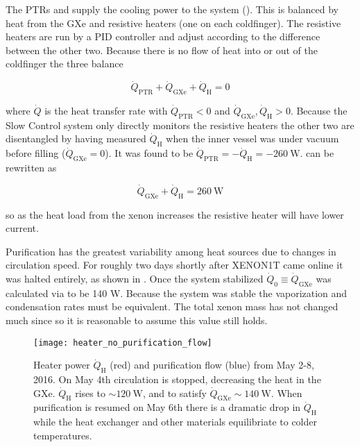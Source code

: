 The PTRs and  supply the cooling power to the system ().  This is balanced by heat from the GXe and
resistive heaters (one on each coldfinger).  The resistive heaters are run by a PID controller and adjust according to the difference
between the other two.  Because there is no flow of heat into or out of the coldfinger the three balance

\begin{equation}
\dot{Q}_{\mathrm{PTR}} + \dot{Q}_{\mathrm{GXe}} + \dot{Q}_{\mathrm{H}} = 0
\label{eq:electron_lifetime_model_vap_and_cond_heat_cons}
\end{equation}

\noindent where $\dot{Q}$ is the heat transfer rate with $\dot{Q}_{\mathrm{PTR}} < 0$ and
$\dot{Q}_{\mathrm{GXe}}, \dot{Q}_{\mathrm{H}} > 0$.  Because the Slow Control system only directly monitors the resistive heaters the
other two are disentangled by having measured $\dot{Q}_{\mathrm{H}}$ when the inner vessel was under vacuum before filling
($\dot{Q}_{\mathrm{GXe}} = 0$).  It was found
to be $\dot{Q}_{\mathrm{PTR}} = -\dot{Q}_{\mathrm{H}} = -260\ \mathrm{W}$.   can
be rewritten as

\begin{equation}
\dot{Q}_{\mathrm{GXe}} + \dot{Q}_{\mathrm{H}} = 260\ \mathrm{W}
\label{eq:electron_lifetime_model_vap_and_cond_heat_gxe}
\end{equation}

\noindent so as the heat load from the xenon increases the resistive heater will have lower current.

Purification has the greatest variability among heat sources due to changes in circulation speed.  For roughly two days shortly after
XENON1T came online it was halted entirely, as shown in .  Once the system
stabilized $\dot{Q}_0 \equiv \dot{Q}_{\mathrm{GXe}}$ was calculated via
 to be 140 W.  Because the system was stable the vaporization and condensation
rates must be equivalent.  The total xenon mass has not changed much since so it is reasonable to assume this value still holds.

\begin{figure}
\centering
\texttt{[image: heater\_no\_purification\_flow]}
\caption{Heater power $\dot{Q}_{\mathrm{H}}$ (red) and purification flow (blue) from May 2-8, 2016.  On May 4th circulation is stopped,
decreasing the heat in the GXe.  $\dot{Q}_{\mathrm{H}}$ rises to ${\sim}120\ \mathrm{W}$, and to satisfy
 $\dot{Q}_{\mathrm{GXe}} \sim 140\ \mathrm{W}$.  When purification is resumed on
May 6th
there is a dramatic drop in $\dot{Q}_{\mathrm{H}}$ while the heat exchanger and other materials equilibriate to colder temperatures.}
\label{fig:electron_lifetime_model_vap_and_cond_no_flow}
\end{figure}

